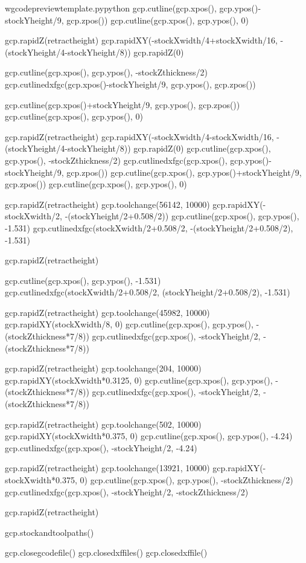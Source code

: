 \documentclass{ltxdoc}
\begin{document}
\begin{writecode}{w}{gcodepreviewtemplate.py}{python}
gcp.cutline(gcp.xpos(), gcp.ypos()-stockYheight/9, gcp.zpos())
gcp.cutline(gcp.xpos(), gcp.ypos(), 0)

gcp.rapidZ(retractheight)
gcp.rapidXY(-stockXwidth/4+stockXwidth/16, -(stockYheight/4-stockYheight/8))
gcp.rapidZ(0)

gcp.cutline(gcp.xpos(), gcp.ypos(), -stockZthickness/2)
gcp.cutlinedxfgc(gcp.xpos()-stockYheight/9, gcp.ypos(), gcp.zpos())

gcp.cutline(gcp.xpos()+stockYheight/9, gcp.ypos(), gcp.zpos())
gcp.cutline(gcp.xpos(), gcp.ypos(), 0)

gcp.rapidZ(retractheight)
gcp.rapidXY(-stockXwidth/4-stockXwidth/16, -(stockYheight/4-stockYheight/8))
gcp.rapidZ(0)
gcp.cutline(gcp.xpos(), gcp.ypos(), -stockZthickness/2)
gcp.cutlinedxfgc(gcp.xpos(), gcp.ypos()-stockYheight/9, gcp.zpos())
gcp.cutline(gcp.xpos(), gcp.ypos()+stockYheight/9, gcp.zpos())
gcp.cutline(gcp.xpos(), gcp.ypos(), 0)

gcp.rapidZ(retractheight)
gcp.toolchange(56142, 10000)
gcp.rapidXY(-stockXwidth/2, -(stockYheight/2+0.508/2))
gcp.cutline(gcp.xpos(), gcp.ypos(), -1.531)
gcp.cutlinedxfgc(stockXwidth/2+0.508/2, -(stockYheight/2+0.508/2), -1.531)

gcp.rapidZ(retractheight)

gcp.cutline(gcp.xpos(), gcp.ypos(), -1.531)
gcp.cutlinedxfgc(stockXwidth/2+0.508/2, (stockYheight/2+0.508/2), -1.531)

gcp.rapidZ(retractheight)
gcp.toolchange(45982, 10000)
gcp.rapidXY(stockXwidth/8, 0)
gcp.cutline(gcp.xpos(), gcp.ypos(), -(stockZthickness*7/8))
gcp.cutlinedxfgc(gcp.xpos(), -stockYheight/2, -(stockZthickness*7/8))

gcp.rapidZ(retractheight)
gcp.toolchange(204, 10000)
gcp.rapidXY(stockXwidth*0.3125, 0)
gcp.cutline(gcp.xpos(), gcp.ypos(), -(stockZthickness*7/8))
gcp.cutlinedxfgc(gcp.xpos(), -stockYheight/2, -(stockZthickness*7/8))

gcp.rapidZ(retractheight)
gcp.toolchange(502, 10000)
gcp.rapidXY(stockXwidth*0.375, 0)
gcp.cutline(gcp.xpos(), gcp.ypos(), -4.24)
gcp.cutlinedxfgc(gcp.xpos(), -stockYheight/2, -4.24)

gcp.rapidZ(retractheight)
gcp.toolchange(13921, 10000)
gcp.rapidXY(-stockXwidth*0.375, 0)
gcp.cutline(gcp.xpos(), gcp.ypos(), -stockZthickness/2)
gcp.cutlinedxfgc(gcp.xpos(), -stockYheight/2, -stockZthickness/2)

gcp.rapidZ(retractheight)

gcp.stockandtoolpaths()

gcp.closegcodefile()
gcp.closedxffiles()
gcp.closedxffile()

\end{writecode}
\addtocounter{gcptmplpy}{285}
\end{document}
